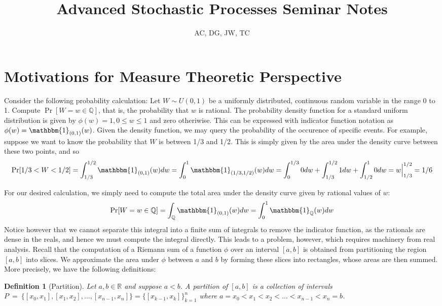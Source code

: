 \documentclass[10pt, oneside]{article}
\title{Advanced Stochastic Processes Seminar Notes}
\author{AC, DG, JW, TC}
\newcommand{\R}{\mathbb{R}}
\newcommand{\Q}{\mathbb{Q}}
\newtheorem{defn}{Definition}
\begin{document}
\maketitle
\tableofcontents

\vspace{.25in}

\section{Motivations for Measure Theoretic Perspective}
Consider the following probability calculation: Let $W\sim U(0,1)$ be a uniformly distributed, 
continuous random variable in the range 0 to 1. Compute $\Pr[W=w\in \Q]$, that is, the 
probability that $w$ is rational.
The probability density function for a standard uniform distribution is given by $\phi(w)=1,0\le w\le1$ and zero otheriwise. 
This can be expressed with indicator function notation as $\phi(w)=\mathbbm{1}_{(0,1)}(w)$.
Given the density function, we may query the probability of the occurence of specific events.
For example, suppose we want to know the probability that $W$ is between 1/3 and 1/2.
This is simply given by the area under the density curve between these two points, and so
$$\Pr[1/3<W<1/2]=\int_{1/3}^{1/2}\mathbbm{1}_{(0,1)}(w)dw=\int_{0}^{1}\mathbbm{1}_{(1/3,1/2)}(w)dw=\int_{0}^{1/3}0dw+\int_{1/3}^{1/2}1dw+\int_{1/2}^{1}0dw=w\Big|_{1/3}^{1/2}=1/6$$

For our desired calculation, we simply need to compute the total area under the density 
curve given by rational values of $w$:
$$\Pr[W=w\in\Q]=\int_{\Q}\mathbbm{1}_{(0,1)}(w)dw=\int_{0}^{1}\mathbbm{1}_{\Q}(w)dw$$
Notice however that we cannot separate this integral into a finite sum of integrals to 
remove the indicator function, as the rationals are dense in the reals, and hence we must 
compute the integral directly.
This leads to a problem, however, which requires machinery from real analysis.
Recall that the computation of a Riemann sum of a function $\phi$ over an interval $[a,b]$ is obtained from partitioning the region $[a,b]$ into slices.
We approximate the area under $\phi$ between $a$ and $b$ by forming these slices into rectangles, whose areas are then summed.
More precisely, we have the following definitions:

\begin{defn}[Partition]
\label{defn:partition}
Let $a,b\in \R$ and suppose $a<b$. A partition of $[a,b]$ is a collection of intervals $P~=~\{[x_0,x_1],[x_1,x_2],\ldots,[x_{n-1},x_n]\}=\{[x_{k-1},x_{k}]\}_{k=1}^n$ where $a=x_0<x_1<x_2<\ldots<x_{n-1}<x_n=b$.
\end{defn}
\end{document}
